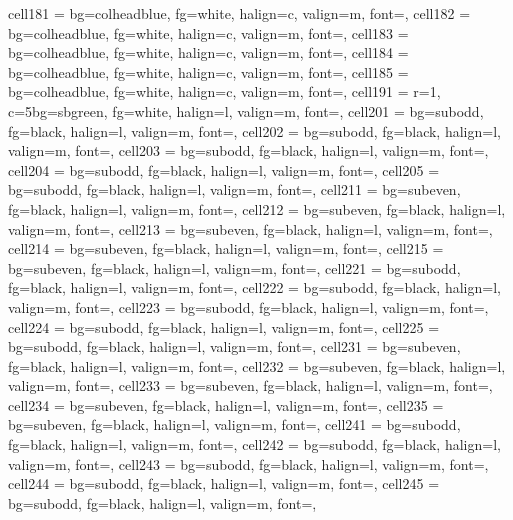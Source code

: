 \documentclass[a4paper,12pt]{article}
\begin{document}
\begin{longtblr}
{  cell{18}{1} = {bg=colheadblue, fg=white, halign=c, valign=m, font=\bfseries},
  cell{18}{2} = {bg=colheadblue, fg=white, halign=c, valign=m, font=\bfseries},
  cell{18}{3} = {bg=colheadblue, fg=white, halign=c, valign=m, font=\bfseries},
  cell{18}{4} = {bg=colheadblue, fg=white, halign=c, valign=m, font=\bfseries},
  cell{18}{5} = {bg=colheadblue, fg=white, halign=c, valign=m, font=\bfseries},
  cell{19}{1} = {r=1, c=5}{bg=sbgreen, fg=white, halign=l, valign=m, font=\small\bfseries},
  cell{20}{1} = {bg=subodd,  fg=black, halign=l, valign=m, font=\footnotesize},
  cell{20}{2} = {bg=subodd,  fg=black, halign=l, valign=m, font=\footnotesize},
  cell{20}{3} = {bg=subodd,  fg=black, halign=l, valign=m, font=\footnotesize},
  cell{20}{4} = {bg=subodd,  fg=black, halign=l, valign=m, font=\footnotesize},
  cell{20}{5} = {bg=subodd,  fg=black, halign=l, valign=m, font=\footnotesize},
  cell{21}{1} = {bg=subeven, fg=black, halign=l, valign=m, font=\footnotesize},
  cell{21}{2} = {bg=subeven, fg=black, halign=l, valign=m, font=\footnotesize},
  cell{21}{3} = {bg=subeven, fg=black, halign=l, valign=m, font=\footnotesize},
  cell{21}{4} = {bg=subeven, fg=black, halign=l, valign=m, font=\footnotesize},
  cell{21}{5} = {bg=subeven, fg=black, halign=l, valign=m, font=\footnotesize},
  cell{22}{1} = {bg=subodd,  fg=black, halign=l, valign=m, font=\footnotesize},
  cell{22}{2} = {bg=subodd,  fg=black, halign=l, valign=m, font=\footnotesize},
  cell{22}{3} = {bg=subodd,  fg=black, halign=l, valign=m, font=\footnotesize},
  cell{22}{4} = {bg=subodd,  fg=black, halign=l, valign=m, font=\footnotesize},
  cell{22}{5} = {bg=subodd,  fg=black, halign=l, valign=m, font=\footnotesize},
  cell{23}{1} = {bg=subeven, fg=black, halign=l, valign=m, font=\footnotesize},
  cell{23}{2} = {bg=subeven, fg=black, halign=l, valign=m, font=\footnotesize},
  cell{23}{3} = {bg=subeven, fg=black, halign=l, valign=m, font=\footnotesize},
  cell{23}{4} = {bg=subeven, fg=black, halign=l, valign=m, font=\footnotesize},
  cell{23}{5} = {bg=subeven, fg=black, halign=l, valign=m, font=\footnotesize},
  cell{24}{1} = {bg=subodd,  fg=black, halign=l, valign=m, font=\footnotesize},
  cell{24}{2} = {bg=subodd,  fg=black, halign=l, valign=m, font=\footnotesize},
  cell{24}{3} = {bg=subodd,  fg=black, halign=l, valign=m, font=\footnotesize},
  cell{24}{4} = {bg=subodd,  fg=black, halign=l, valign=m, font=\footnotesize},
  cell{24}{5} = {bg=subodd,  fg=black, halign=l, valign=m, font=\footnotesize},
}
\end{longtblr}
\end{document}
